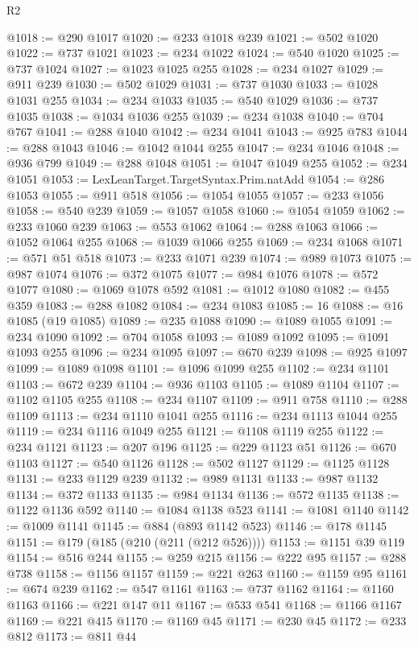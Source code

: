 \begin{lexlean}{R2}
\begin{coremodule}
@1018 := @290 @1017
@1020 := @233 @1018 @239
@1021 := @502 @1020
@1022 := @737 @1021
@1023 := @234 @1022
@1024 := @540 @1020
@1025 := @737 @1024
@1027 := @1023 @1025 @255
@1028 := @234 @1027
@1029 := @911 @239
@1030 := @502 @1029
@1031 := @737 @1030
@1033 := @1028 @1031 @255
@1034 := @234 @1033
@1035 := @540 @1029
@1036 := @737 @1035
@1038 := @1034 @1036 @255
@1039 := @234 @1038
@1040 := @704 @767
@1041 := @288 @1040
@1042 := @234 @1041
@1043 := @925 @783
@1044 := @288 @1043
@1046 := @1042 @1044 @255
@1047 := @234 @1046
@1048 := @936 @799
@1049 := @288 @1048
@1051 := @1047 @1049 @255
@1052 := @234 @1051
@1053 := LexLeanTarget.TargetSyntax.Prim.natAdd
@1054 := @286 @1053
@1055 := @911 @518
@1056 := @1054 @1055
@1057 := @233 @1056
@1058 := @540 @239
@1059 := @1057 @1058
@1060 := @1054 @1059
@1062 := @233 @1060 @239
@1063 := @553 @1062
@1064 := @288 @1063
@1066 := @1052 @1064 @255
@1068 := @1039 @1066 @255
@1069 := @234 @1068
@1071 := @571 @51 @518
@1073 := @233 @1071 @239
@1074 := @989 @1073
@1075 := @987 @1074
@1076 := @372 @1075
@1077 := @984 @1076
@1078 := @572 @1077
@1080 := @1069 @1078 @592
@1081 := @1012 @1080
@1082 := @455 @359
@1083 := @288 @1082
@1084 := @234 @1083
@1085 := 16
@1088 := @16 @1085 (@19 @1085)
@1089 := @235 @1088
@1090 := @1089 @1055
@1091 := @234 @1090
@1092 := @704 @1058
@1093 := @1089 @1092
@1095 := @1091 @1093 @255
@1096 := @234 @1095
@1097 := @670 @239
@1098 := @925 @1097
@1099 := @1089 @1098
@1101 := @1096 @1099 @255
@1102 := @234 @1101
@1103 := @672 @239
@1104 := @936 @1103
@1105 := @1089 @1104
@1107 := @1102 @1105 @255
@1108 := @234 @1107
@1109 := @911 @758
@1110 := @288 @1109
@1113 := @234 @1110 @1041 @255
@1116 := @234 @1113 @1044 @255
@1119 := @234 @1116 @1049 @255
@1121 := @1108 @1119 @255
@1122 := @234 @1121
@1123 := @207 @196
@1125 := @229 @1123 @51
@1126 := @670 @1103
@1127 := @540 @1126
@1128 := @502 @1127
@1129 := @1125 @1128
@1131 := @233 @1129 @239
@1132 := @989 @1131
@1133 := @987 @1132
@1134 := @372 @1133
@1135 := @984 @1134
@1136 := @572 @1135
@1138 := @1122 @1136 @592
@1140 := @1084 @1138 @523
@1141 := @1081 @1140
@1142 := @1009 @1141
@1145 := @884 (@893 @1142 @523)
@1146 := @178 @1145
@1151 := @179 (@185 (@210 (@211 (@212 @526))))
@1153 := @1151 @39 @119
@1154 := @516 @244
@1155 := @259 @215
@1156 := @222 @95
@1157 := @288 @738
@1158 := @1156 @1157
@1159 := @221 @263
@1160 := @1159 @95
@1161 := @674 @239
@1162 := @547 @1161
@1163 := @737 @1162
@1164 := @1160 @1163
@1166 := @221 @147 @11
@1167 := @533 @541
@1168 := @1166 @1167
@1169 := @221 @415
@1170 := @1169 @45
@1171 := @230 @45
@1172 := @233 @812
@1173 := @811 @44

\end{coremodule}
\end{lexlean}
